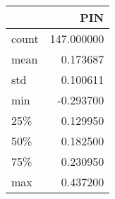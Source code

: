 \begin{tabular}{lr}
\toprule
{} &         PIN \\
\midrule
count &  147.000000 \\
mean  &    0.173687 \\
std   &    0.100611 \\
min   &   -0.293700 \\
25\%   &    0.129950 \\
50\%   &    0.182500 \\
75\%   &    0.230950 \\
max   &    0.437200 \\
\bottomrule
\end{tabular}
